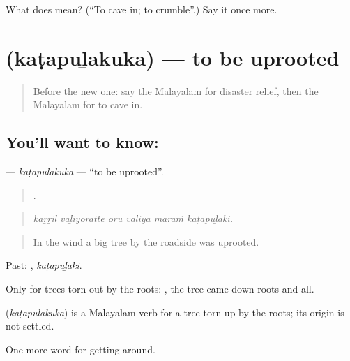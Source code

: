 \begin{tcolorbox}[breakable,colback=teal!4,colframe=teal!35!black,title={Before you move on}]
What does  mean? (\textquotedblleft{}To cave in; to crumble\textquotedblright{}.) Say it once more.
\end{tcolorbox}
\section[\texorpdfstring{\ml{കടപുഴകുക} (kaṭapuḻakuka)}{കടപുഴകുക (kaṭapuḻakuka)}]{ (kaṭapuḻakuka) — to be uprooted}

\label{lesson:ML-C513-katapulakuka}



\begin{quote}
Before the new one: say the Malayalam for disaster relief, then the Malayalam for to cave in.
\end{quote}

\subsection*{You'll want to know: }
\textbf{} — \emph{kaṭapuḻakuka} — \textquotedblleft{}to be uprooted\textquotedblright{}.

\begin{quote}
     .
\end{quote}

\begin{quote}
\emph{kāṟṟil vaḻiyōratte oru valiya maraṁ kaṭapuḻaki.}
\end{quote}

\begin{quote}
In the wind a big tree by the roadside was uprooted.
\end{quote}

Past: , \emph{kaṭapuḻaki}.

Only for trees torn out by the roots:  , the tree came down roots and all.

\begin{cousinweb}
\textbf{} (\emph{kaṭapuḻakuka}) is a Malayalam verb for a tree torn up by the roots; its origin is not settled.
\end{cousinweb}

\begin{grammarlens}[title={What you've built}]
One more word for getting around.
\end{grammarlens}


